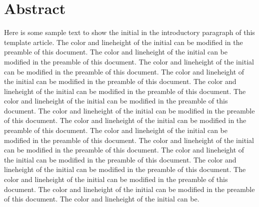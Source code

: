 \section{Abstract}\label{abstract}


Here is some sample text to show the initial in the introductory
paragraph of this template article. The color and lineheight of the
initial can be modified in the preamble of this document. The color and
lineheight of the initial can be modified in the preamble of this
document. The color and lineheight of the initial can be modified in the
preamble of this document. The color and lineheight of the initial can
be modified in the preamble of this document. The color and lineheight
of the initial can be modified in the preamble of this document. The
color and lineheight of the initial can be modified in the preamble of
this document. The color and lineheight of the initial can be modified
in the preamble of this document. The color and lineheight of the
initial can be modified in the preamble of this document. The color and
lineheight of the initial can be modified in the preamble of this
document. The color and lineheight of the initial can be modified in the
preamble of this document. The color and lineheight of the initial can
be modified in the preamble of this document. The color and lineheight
of the initial can be modified in the preamble of this document. The
color and lineheight of the initial can be modified in the preamble of
this document. The color and lineheight of the initial can be modified
in the preamble of this document. The color and lineheight of the
initial can be.
